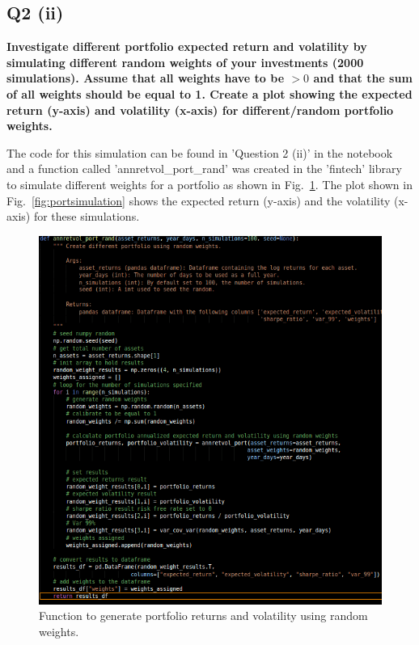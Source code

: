 

\subsection{Q2 (ii)}\label{sssec:pt1q2ii}

\textbf{Investigate different portfolio expected return and volatility by simulating different random
weights of your investments (2000 simulations). Assume that all weights have to be $>0$ and that the
sum of all weights should be equal to 1. Create a plot showing the expected return (y-axis) and volatility (x-axis) for different/random portfolio weights.}

\noindent
The code for this simulation can be found in 'Question 2 (ii)' in the notebook and a function called 'annretvol\_port\_rand' was created in the 'fintech' library to simulate different weights for a portfolio as shown in Fig.~\ref{fig:portsimulationcode}. The plot shown in Fig.~\ref{fig:portsimulation} shows the expected return (y-axis) and the volatility (x-axis) for these simulations. 

\begin{figure}[H]
\centering
  \includegraphics[scale = .65]{imgs/port_sim_code.png}
  \caption{Function to generate portfolio returns and volatility using random weights.}
  \label{fig:portsimulationcode}
\end{figure}

